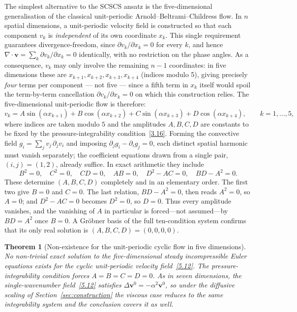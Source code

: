 \documentclass[11pt]{jfm}
\newtheorem{theorem}[lemma]{Theorem}
\numberwithin{equation}{section}
\begin{document}
The simplest alternative to the SCSCS ansatz is the five-dimensional generalisation of the
classical unit-periodic Arnold--Beltrami--Childress flow. In $n$ spatial dimensions, a unit-periodic
velocity field is constructed so that each component $v_k$ is \emph{independent} of its
own coordinate $x_k$. This single requirement guarantees divergence-freedom, since
$\partial v_k/\partial x_k = 0$ for every $k$, and hence
$\nabla\cdot\boldsymbol{v} = \sum_k \partial v_k/\partial x_k = 0$ identically, with no
restriction on the phase angles. As a consequence, $v_k$ may only involve the remaining
$n-1$ coordinates: in five dimensions these are $x_{k+1}, x_{k+2}, x_{k+3}, x_{k+4}$
(indices modulo 5), giving precisely \emph{four} terms per component --- not five --- since a
fifth term in $x_k$ itself would spoil the term-by-term cancellation
$\partial v_k/\partial x_k=0$ on which this construction relies. The five-dimensional unit-periodic flow
is therefore:
\begin{equation}
\label{5.12}
v_k = A\sin(\alpha x_{k+1}) + B\cos(\alpha x_{k+2}) + C\sin(\alpha x_{k+3}) +
D\cos(\alpha x_{k+4}), \qquad k = 1,\ldots,5,
\end{equation}
where indices are taken modulo $5$ and the amplitudes $A,B,C,D$ are constants to be fixed by the
pressure-integrability condition~\eqref{3.16}. Forming the convective field
$g_i=\sum_j v_j\,\partial_j v_i$ and imposing $\partial_j g_i-\partial_i g_j=0$, each distinct
spatial harmonic must vanish separately; the coefficient equations drawn from a single pair,
$(i,j)=(1,2)$, already suffice. In exact arithmetic they include
\begin{equation}
\label{5.13}
B^2=0,\quad C^2=0,\quad CD=0,\quad AB=0,\quad D^2-AC=0,\quad BD-A^2=0 .
\end{equation}
These determine $(A,B,C,D)$ completely and in an elementary order. The first two give $B=0$ and
$C=0$. The last relation, $BD-A^2=0$, then reads $A^2=0$, so $A=0$; and $D^2-AC=0$ becomes
$D^2=0$, so $D=0$. Thus every amplitude vanishes, and the vanishing of $A$ in particular is
forced---not assumed---by $BD=A^2$ once $B=0$. A Gr\"obner basis of the full ten-condition system
confirms that its only real solution is $(A,B,C,D)=(0,0,0,0)$.

\begin{theorem}[Non-existence for the unit-periodic cyclic flow in five dimensions]
\label{thm:5D-unit}
No non-trivial exact solution to the five-dimensional steady incompressible Euler equations
exists for the cyclic unit-periodic velocity field~\eqref{5.12}. The pressure-integrability
condition forces $A=B=C=D=0$. As in seven dimensions, the single-wavenumber
field~\eqref{5.12} satisfies $\Delta\boldsymbol{v}^0=-\alpha^2\boldsymbol{v}^0$, so under the
diffusive scaling of Section~\ref{sec:construction} the viscous case reduces to the same
integrability system and the conclusion covers it as well.
\end{theorem}
\end{document}
